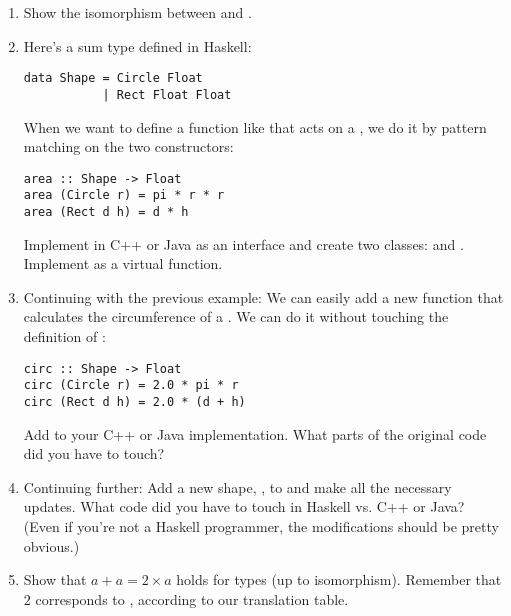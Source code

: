 \begin{enumerate}
\tightlist
\item
  Show the isomorphism between  and
  .
\item
  Here's a sum type defined in Haskell:

\begin{Verbatim}
data Shape = Circle Float 
           | Rect Float Float
\end{Verbatim}
  When we want to define a function like  that acts on a
  , we do it by pattern matching on the two constructors:

\begin{Verbatim}
area :: Shape -> Float
area (Circle r) = pi * r * r
area (Rect d h) = d * h
\end{Verbatim}
  Implement  in C++ or Java as an interface and create two
  classes:  and . Implement  as
  a virtual function.
\item
  Continuing with the previous example: We can easily add a new function
   that calculates the circumference of a .
  We can do it without touching the definition of :

\begin{Verbatim}
circ :: Shape -> Float
circ (Circle r) = 2.0 * pi * r
circ (Rect d h) = 2.0 * (d + h)
\end{Verbatim}
  Add  to your C++ or Java implementation. What parts of
  the original code did you have to touch?
\item
  Continuing further: Add a new shape, , to
   and make all the necessary updates. What code did you
  have to touch in Haskell vs. C++ or Java? (Even if you're not a
  Haskell programmer, the modifications should be pretty obvious.)
\item
  Show that $a + a = 2 \times a$ holds for types (up to
  isomorphism). Remember that $2$ corresponds to ,
  according to our translation table.
\end{enumerate}
